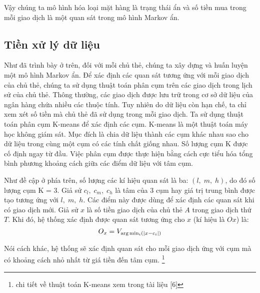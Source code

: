 Vậy chúng ta mô hình hóa loại mặt hàng là trạng thái ẩn và số tiền mua trong mỗi giao dịch là một quan sát trong mô hình Markov ẩn.

\subsection{Tiền xử lý dữ liệu}
Như đã trình bày ở trên, đối với mỗi chủ thẻ, chúng ta xây dựng và huấn luyện một mô hình Markov ẩn. Để xác định các quan sát tương ứng với mỗi giao dịch của chủ thẻ, chúng ta sử dụng thuật toán phân cụm trên các giao dịch trong lịch sử của chủ thẻ. Thông thường, các giao dịch được lưu trữ trong cơ sở dữ liệu của ngân hàng chứa nhiều các thuộc tính. Tuy nhiên do dữ liệu còn hạn chế, ta chỉ xem xét số tiền mà chủ thẻ đã sử dụng trong mỗi giao dịch. Ta sử dụng thuật toán phân cụm K-means để xác định các cụm. K-means là một thuật toán máy học không giám sát. Mục đích là chia dữ liệu thành các cụm khác nhau sao cho dữ liệu trong cùng một cụm có các tính chất giống nhau. Số lượng cụm K được cố định ngay từ đầu. Việc phân cụm được thực hiện bằng cách cực tiểu hóa tổng bình phương khoảng cách giữa các điểm dữ liệu với tâm cụm.

Như đề cập ở phía trên, số lượng các kí hiệu quan sát là ba: $(l,\; m,\; h)$, do đó số lượng cụm K = 3. Giả sử $c_l,\; c_m,\; c_h$ là tâm của 3 cụm hay giá trị trung bình được tạo tương ứng với  $l,\; m,\; h$. Các điểm này được dùng để xác định các quan sát khi có giao dịch mới. Giả sử $x$ là số tiền giao dịch của chủ thẻ $A$ trong giao dịch thứ $T$. Khi đó, hệ thống xác định được quan sát tương ứng cho $x$ (kí hiệu là $Ox$) là: 
$$O_x=V_{\arg\min_i(|x-c_i|)}$$

Nói cách khác, hệ thống sẽ xác định quan sát cho mỗi giao dịch ứng với cụm mà có khoảng cách nhỏ nhất từ giá tiền đến tâm cụm. \footnote{chi tiết về thuật toán K-means xem trong tài liệu [6]}

